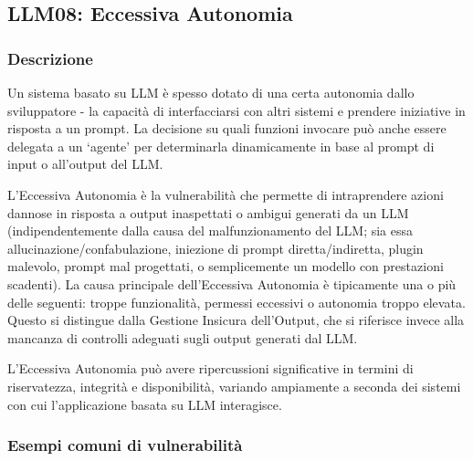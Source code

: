 \documentclass[
]{article}
\author{}
\date{}
\begin{document}
\subsection{LLM08: Eccessiva Autonomia}\label{llm08-eccessiva-autonomia}

\subsubsection{Descrizione}\label{descrizione}

Un sistema basato su LLM è spesso dotato di una certa autonomia dallo
sviluppatore - la capacità di interfacciarsi con altri sistemi e
prendere iniziative in risposta a un prompt. La decisione su quali
funzioni invocare può anche essere delegata a un `agente' per
determinarla dinamicamente in base al prompt di input o all'output del
LLM.

L'Eccessiva Autonomia è la vulnerabilità che permette di intraprendere
azioni dannose in risposta a output inaspettati o ambigui generati da un
LLM (indipendentemente dalla causa del malfunzionamento del LLM; sia
essa allucinazione/confabulazione, iniezione di prompt
diretta/indiretta, plugin malevolo, prompt mal progettati, o
semplicemente un modello con prestazioni scadenti). La causa principale
dell'Eccessiva Autonomia è tipicamente una o più delle seguenti: troppe
funzionalità, permessi eccessivi o autonomia troppo elevata. Questo si
distingue dalla Gestione Insicura dell'Output, che si riferisce invece
alla mancanza di controlli adeguati sugli output generati dal LLM.

L'Eccessiva Autonomia può avere ripercussioni significative in termini
di riservatezza, integrità e disponibilità, variando ampiamente a
seconda dei sistemi con cui l'applicazione basata su LLM interagisce.

\subsubsection{Esempi comuni di
vulnerabilità}\label{esempi-comuni-di-vulnerabilituxe0}
\end{document}
